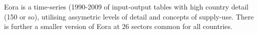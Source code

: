 
Eora is a time-series (1990-2009 of input-output tables with high country detail (150 or so), utilising assymetric levels of detail and concepts of supply-use. There is further a smaller version of Eora at 26 sectors common for all countries.